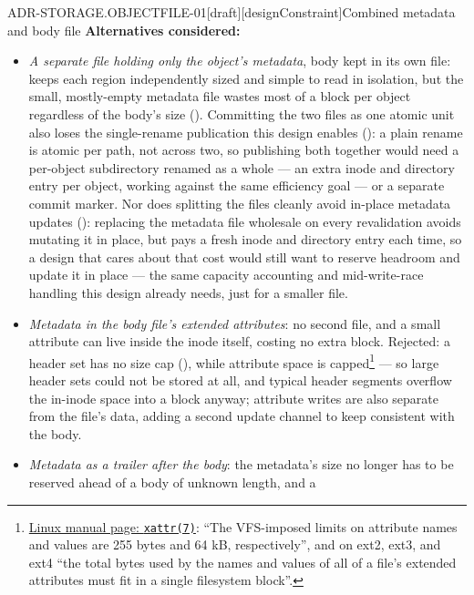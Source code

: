\begin{requirement}{ADR-STORAGE.OBJECTFILE-01}[draft][designConstraint]{Combined metadata and body file}
  \textbf{Alternatives considered:}
  \begin{itemize}
    \item \emph{A separate file holding only the object's metadata}, body
      kept in its own file: keeps each region independently sized and
      simple to read in isolation, but the small, mostly-empty metadata
      file wastes most of a block per object regardless of the body's
      size (). Committing the two
      files as one atomic unit also loses the single-rename publication
      this design enables (): a plain
      rename is atomic per path, not across two, so publishing both
      together would need a per-object subdirectory renamed as a whole
      --- an extra inode and directory entry per object, working against
      the same efficiency goal --- or a separate commit marker. Nor does
      splitting the files cleanly avoid in-place metadata updates
      (): replacing the metadata file
      wholesale on every revalidation avoids mutating it in place, but
      pays a fresh inode and directory entry each time, so a design that
      cares about that cost would still want to reserve headroom and
      update it in place --- the same capacity accounting and
      mid-write-race handling this design already needs, just for a
      smaller file.
    \item \emph{Metadata in the body file's extended attributes}: no second
      file, and a small attribute can live inside the inode itself, costing
      no extra block. Rejected: a header set has no size cap
      (), while attribute space is
      capped\footnote{\href{https://man7.org/linux/man-pages/man7/xattr.7.html}{Linux
      manual page: \texttt{xattr(7)}}: ``The VFS-imposed limits on attribute
      names and values are 255 bytes and 64 kB, respectively'', and on ext2,
      ext3, and ext4 ``the total bytes used by the names and values of all of
      a file's extended attributes must fit in a single filesystem block''.}
      --- so large header sets could not be stored at all, and typical
      header segments overflow the in-inode space into a block anyway;
      attribute writes are also separate from the file's data, adding a
      second update channel to keep consistent with the body.
    \item \emph{Metadata as a trailer after the body}: the metadata's size
      no longer has to be reserved ahead of a body of unknown length, and a

\end{itemize}
\end{requirement}
